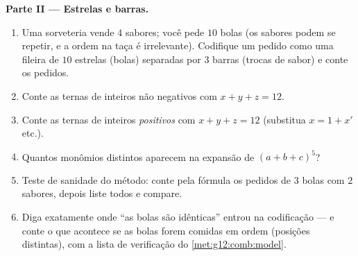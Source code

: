 \begin{problem}
\medskip
\noindent\textbf{Parte II --- Estrelas e barras.}
\begin{enumerate}[resume]
  \item Uma sorveteria vende $4$ sabores; você pede $10$ bolas
        (os sabores podem se repetir, e a ordem na taça é
        irrelevante). Codifique um pedido como uma fileira de
        $10$ estrelas (bolas) separadas por $3$ barras (trocas de
        sabor) e conte os pedidos.
  \item Conte as ternas de inteiros não negativos com
        $x + y + z = 12$.
  \item Conte as ternas de inteiros \emph{positivos} com
        $x + y + z = 12$ (substitua $x = 1 + x'$ etc.).
  \item Quantos monômios distintos aparecem na expansão de
        $(a + b + c)^5$?
  \item Teste de sanidade do método: conte pela fórmula os
        pedidos de $3$ bolas com $2$ sabores, depois liste todos
        e compare.
  \item Diga exatamente onde ``as bolas são idênticas'' entrou na
        codificação --- e conte o que acontece se as bolas forem
        comidas em ordem (posições distintas), com a lista de
        verificação do \cref{met:g12:comb:model}.
\end{enumerate}


\end{problem}
